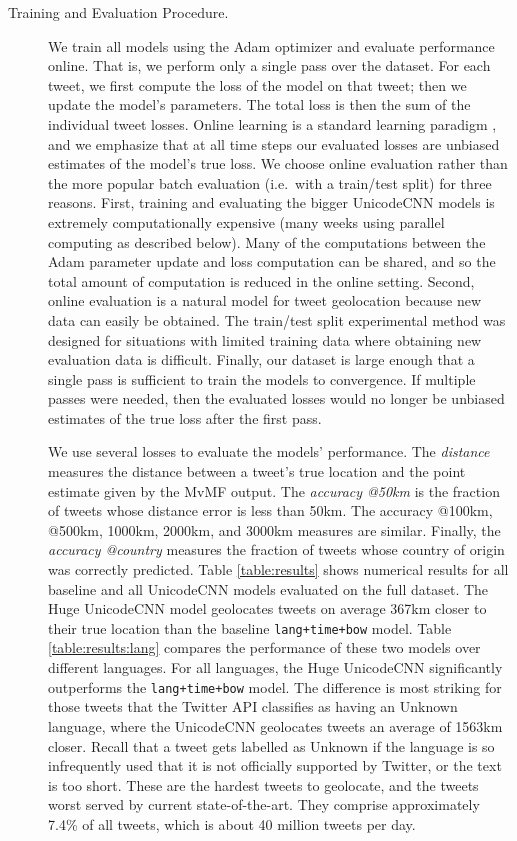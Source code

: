 \documentclass[sigconf,anonymous,review]{acmart}
\newcommand{\str}[1]{\texttt{#1}}
\newcommand{\defn}[1]{\textit{#1}}
\begin{document}
\begin{description}

\item[Training and Evaluation Procedure.]
We train all models using the Adam optimizer \citep{kingma2014adam} and evaluate performance online.
That is, we perform only a single pass over the dataset.
For each tweet, we first compute the loss of the model on that tweet;
then we update the model's parameters.
The total loss is then the sum of the individual tweet losses.
Online learning is a standard learning paradigm \citep[e.g.][]{understandingml},
and we emphasize that at all time steps our evaluated losses are unbiased estimates of the model's true loss.
We choose online evaluation rather than the more popular batch evaluation (i.e.\ with a train/test split) for three reasons.
First, training and evaluating the bigger UnicodeCNN models is extremely computationally expensive 
(many weeks using parallel computing as described below).
Many of the computations between the Adam parameter update and loss computation can be shared,
and so the total amount of computation is reduced in the online setting.
Second, online evaluation is a natural model for tweet geolocation because new data can easily be obtained.
The train/test split experimental method was designed for situations with limited training data where obtaining new evaluation data is difficult.
Finally, our dataset is large enough that a single pass is sufficient to train the models to convergence.
If multiple passes were needed, then the evaluated losses would no longer be unbiased estimates of the true loss after the first pass.

We use several losses to evaluate the models' performance.
The \defn{distance} measures the distance between a tweet's true location and the point estimate given by the MvMF output.
The \defn{accuracy @50km} is the fraction of tweets whose distance error is less than 50km.
The {accuracy @100km, @500km, 1000km, 2000km, and 3000km} measures are similar.
Finally, the \defn{accuracy @country} measures the fraction of tweets whose country of origin was correctly predicted.
Table \ref{table:results} shows numerical results for all baseline and all UnicodeCNN models evaluated on the full dataset.
The Huge UnicodeCNN model geolocates tweets on average 367km closer to their true location than the baseline \str{lang+time+bow} model.
Table \ref{table:results:lang} compares the performance of these two models over different languages.
For all languages, the Huge UnicodeCNN significantly outperforms the \str{lang+time+bow} model.
The difference is most striking for those tweets that the Twitter API classifies as having an Unknown language,
where the UnicodeCNN geolocates tweets an average of 1563km closer.
Recall that a tweet gets labelled as Unknown if the language is so infrequently used that it is not officially supported by Twitter,
or the text is too short.
These are the hardest tweets to geolocate,
and the tweets worst served by current state-of-the-art.
They comprise approximately 7.4\% of all tweets,
which is about 40 million tweets per day.


\end{description}
\end{document}
